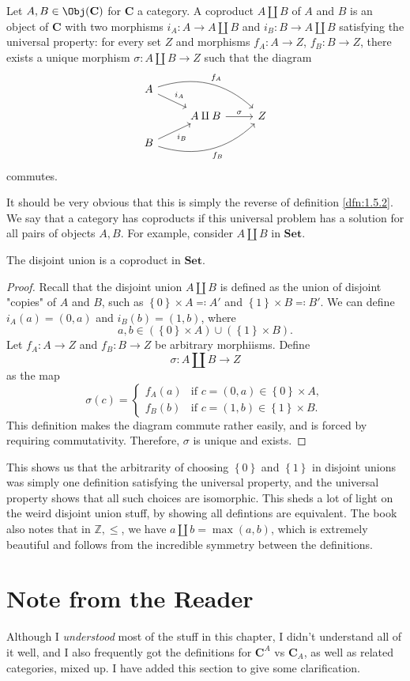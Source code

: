 \begin{definition}[Coproduct]\label{dfn:1.5.3}
Let $A,B\in \Obj( \mathbf{C} ) $ for $\mathbf{C}$ a category. A coproduct $A\amalg B$ of $A$ and $B$ is an object of $\mathbf{C}$ with two morphisms $i_A : A \to A\amalg B$ and $i_B : B \to A\amalg B$ satisfying the universal property: for every set $Z$ and morphisms $f_A: A \to Z$, $f_B: B \to Z$, there exists a unique morphism $\sigma : A\amalg B \to Z$ such that the diagram
\[\begin{tikzcd}[row sep=1em, column sep=2.5em]
	A\arrow[dr,"i_A"]\arrow[drr,bend left, "f_A"]\\
	&A\amalg B\arrow[r,"\sigma"]&Z\\
	B\arrow[ur,"i_B"']\arrow[urr,bend right, "f_B"']
\end{tikzcd}\]
commutes.
\end{definition}
It should be very obvious that this is simply the reverse  of definition \ref{dfn:1.5.2}. We say that a category has coproducts if this universal problem has a solution for all pairs of objects $A,B$. For example, consider $A\amalg B$ in $\mathbf{Set}$.
\begin{proposition}
	The disjoint union is a coproduct in $\mathbf{Set}$.
\end{proposition}
\begin{proof}
	Recall that the disjoint union $A\amalg B$ is defined as the union of disjoint "copies" of $A$ and $B$, such as $\left\{ 0 \right\} \times A\eqqcolon A'$ and $\left\{ 1 \right\} \times B\eqqcolon B'$. We can define $i_A(a)=(0,a)$ and $i_B(b)=(1,b)$, where
	\[
		a,b\in \left( \left\{ 0 \right\} \times A \right) \cup \left( \left\{ 1 \right\} \times B \right) 
	.\]
	Let $f_A : A \to Z$ and $f_B : B \to Z$ be arbitrary morphiisms. Define
	\[
		\sigma : A\amalg B \to Z
	\]
	as the map
	\[
		\sigma (c) = 
		\begin{cases}
			f_A(a)&\text{if }c=(0,a)\in \left\{ 0 \right\} \times A,\\
			f_B(b)&\text{if }c=(1,b)\in \left\{ 1 \right\} \times B.
		\end{cases}
	\]
	This definition makes the diagram commute rather easily, and is forced by requiring commutativity. Therefore, $\sigma $ is unique and exists.
\end{proof}
This shows us that the arbitrarity of choosing $\left\{ 0 \right\} $ and $\left\{ 1 \right\} $ in disjoint unions was simply one definition satisfying the universal property, and the universal property shows that all such choices are isomorphic. This sheds a lot of light on the weird disjoint union stuff, by showing all defintions are equivalent. The book also notes that in $\mathbb{Z},\leq $, we have $a\amalg b=\max (a,b)$, which is extremely beautiful and follows from the incredible symmetry between the definitions.
\section{Note from the Reader}
Although I \emph{understood} most of the stuff in this chapter, I didn't understand all of it well, and I also frequently got the definitions for $\mathbf{C}^{A}$ vs $\mathbf{C}_{A}$, as well as related categories, mixed up. I have added this section to give some clarification.
